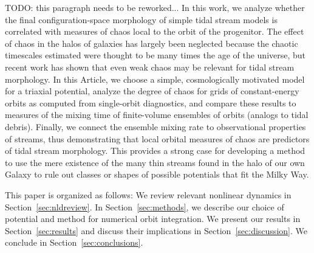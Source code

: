 \documentclass[letterpaper,12pt,preprint]{aastex}
\begin{document}
TODO: this paragraph needs to be reworked...
In this work, we analyze whether the final configuration-space morphology of simple tidal stream models is correlated with measures of chaos local to the orbit of the progenitor. The effect of chaos in the halos of galaxies has largely been neglected because the chaotic timescales estimated were thought to be many times the age of the universe, but recent work has shown that even weak chaos may be relevant for tidal stream morphology. In this Article, we choose a simple, cosmologically motivated model for a triaxial potential, analyze the degree of chaos for grids of constant-energy orbits as computed from single-orbit diagnostics, and compare these results to measures of the mixing time of finite-volume ensembles of orbits (analogs to tidal debris). Finally, we connect the ensemble mixing rate to observational properties of streams, thus demonstrating that local orbital measures of chaos are predictors of tidal stream morphology. This provides a strong case for developing a method to use the mere existence of the many thin streams found in the halo of our own Galaxy to rule out classes or shapes of possible potentials that fit the Milky Way.

This paper is organized as follows: We review relevant nonlinear dynamics in Section~\ref{sec:nldreview}. In Section~\ref{sec:methods}, we describe our choice of potential and method for numerical orbit integration. We present our results in Section~\ref{sec:results} and discuss their implications in Section~\ref{sec:discussion}. We conclude in Section~\ref{sec:conclusions}.


\end{document}
